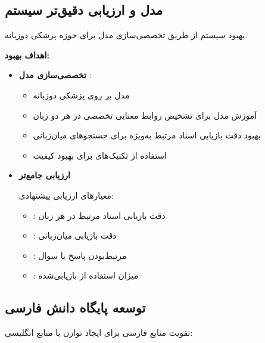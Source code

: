 \documentclass[11pt, a4paper, oneside]{book}
\begin{document}
	\subsection{ مدل  و ارزیابی دقیق‌تر سیستم }

	بهبود سیستم  از طریق تخصصی‌سازی مدل  برای حوزه پزشکی دوزبانه.

	\textbf{اهداف بهبود:}

	\begin{itemize}
		\item \textbf{تخصصی‌سازی مدل }:
		\begin{itemize}
			\item {} مدل  بر روی  پزشکی دوزبانه
			\item آموزش مدل برای تشخیص روابط معنایی تخصصی در هر دو زبان
			\item بهبود دقت بازیابی اسناد مرتبط به‌ویژه برای جستجوهای میان‌زبانی
			\item استفاده از تکنیک‌های  برای بهبود کیفیت 
		\end{itemize}
		
		\item \textbf{ارزیابی جامع‌تر }
		
		معیارهای ارزیابی پیشنهادی:
		\begin{itemize}
			\item {}: دقت بازیابی اسناد مرتبط در هر زبان
			\item {}: دقت بازیابی میان‌زبانی
			\item {}: مرتبط‌بودن پاسخ با سوال
			\item {}: میزان استفاده از  بازیابی‌شده
		\end{itemize}

	\end{itemize}

	\subsection{توسعه پایگاه دانش فارسی}

	تقویت منابع فارسی برای ایجاد توازن با منابع انگلیسی:
\end{document}
